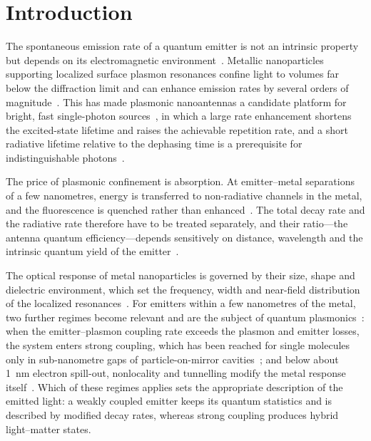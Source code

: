 \documentclass[11pt,a4paper]{article}
\begin{document}
\section{Introduction}

The spontaneous emission rate of a quantum emitter is not an intrinsic property but depends on its
electromagnetic environment~\cite{purcell,novotny}. Metallic nanoparticles supporting localized surface plasmon
resonances confine light to volumes far below the diffraction limit and can enhance emission rates by several
orders of magnitude~\cite{maier,vanhulst,bharadwaj2009}. This has made plasmonic nanoantennas a candidate
platform for bright, fast single-photon sources~\cite{koenderink,hoang,akselrod,senellart}, in which a large
rate enhancement shortens the excited-state lifetime and raises the achievable repetition rate, and a short
radiative lifetime relative to the dephasing time is a prerequisite for indistinguishable photons~\cite{aharonovich}.

The price of plasmonic confinement is absorption. At emitter--metal separations of a few nanometres, energy is
transferred to non-radiative channels in the metal, and the fluorescence is quenched rather than
enhanced~\cite{anger,kuhn,ford,carminati2006}. The total decay rate and the radiative rate therefore have to be
treated separately, and their ratio---the antenna quantum efficiency---depends sensitively on distance,
wavelength and the intrinsic quantum yield of the emitter~\cite{bharadwaj2007,khurgin,lu2020}.

The optical response of metal nanoparticles is governed by their size, shape and dielectric environment, which set
the frequency, width and near-field distribution of the localized resonances~\cite{kelly2003,maier}. For emitters
within a few nanometres of the metal, two further regimes become relevant and are the subject of quantum
plasmonics~\cite{tame2013}: when the emitter--plasmon coupling rate exceeds the plasmon and emitter losses, the
system enters strong coupling, which has been reached for single molecules only in sub-nanometre gaps of
particle-on-mirror cavities~\cite{chikkaraddy2016,torma2015}; and below about \SI{1}{nm} electron spill-out,
nonlocality and tunnelling modify the metal response itself~\cite{savage2012,zhu2016,yang2019}. Which of these
regimes applies sets the appropriate description of the emitted light: a weakly coupled emitter keeps its quantum
statistics and is described by modified decay rates, whereas strong coupling produces hybrid light--matter states.
\end{document}

